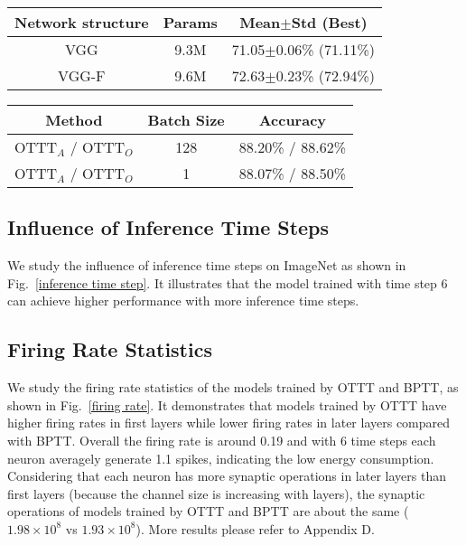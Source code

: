 \documentclass{article}
\begin{document}
\begin{minipage}{0.48\linewidth}
\newcommand{\tabincell}[2]{\begin{tabular}{@{}#1@{}}#2\end{tabular}}
	\centering
	\small
	\tabcolsep=0.5mm
	\begin{tabular}{ccc}
		\toprule[1pt]
		Network structure & Params & Mean$\pm$Std (Best)\\
		\midrule[0.5pt]
		VGG & 9.3M & 71.05$\pm$0.06\% (71.11\%)\\
		VGG-F & 9.6M & 72.63$\pm$0.23\% (72.94\%)\\
		\bottomrule[1pt]
	\end{tabular}
	\label{feedback network}
\end{minipage}
\hspace{4mm}
\begin{minipage}{0.48\linewidth}
	\centering
	\small
	\tabcolsep=0.5mm
	\begin{tabular}{ccc}
		\toprule[1pt]
		Method & Batch Size & Accuracy\\
		\midrule[0.5pt]
		OTTT$_A$ / OTTT$_O$ & 128 & 88.20\% / 88.62\%\\
		OTTT$_A$ / OTTT$_O$ & 1 & 88.07\% / 88.50\%\\
		\bottomrule[1pt]
	\end{tabular}
	\label{batch size 1}
\end{minipage}

\subsection{Influence of Inference Time Steps}
\vspace{-2mm}
We study the influence of inference time steps on ImageNet as shown in Fig.~\ref{inference time step}. It illustrates that the model trained with time step 6 can achieve higher performance with more inference time steps.

\subsection{Firing Rate Statistics}
\vspace{-2mm}
We study the firing rate statistics of the models trained by OTTT and BPTT, as shown in Fig.~\ref{firing rate}. It demonstrates that models trained by OTTT have higher firing rates in first layers while lower firing rates in later layers compared with BPTT. Overall the firing rate is around 0.19 and with 6 time steps each neuron averagely generate 1.1 spikes, indicating the low energy consumption. Considering that each neuron has more synaptic operations in later layers than first layers (because the channel size is increasing with layers), the synaptic operations of models trained by OTTT and BPTT are about the same ($1.98\times10^8$ vs $1.93\times10^8$). More results please refer to Appendix D.
\end{document}

